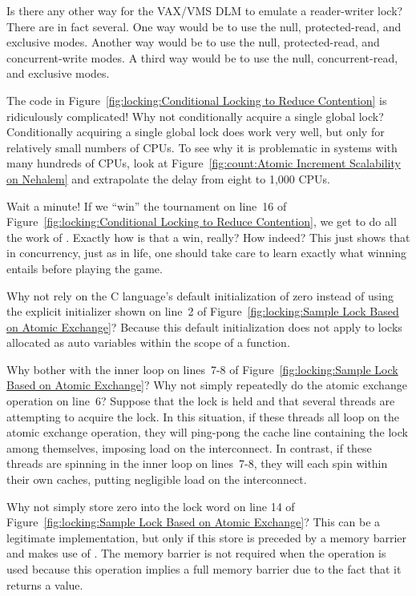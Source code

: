\begin{enumerate}
\QuickQ{}
	Is there any other way for the VAX/VMS DLM to emulate
	a reader-writer lock?
\QuickA{}
	There are in fact several.
	One way would be to use the null, protected-read, and exclusive
	modes.
	Another way would be to use the null, protected-read, and
	concurrent-write modes.
	A third way would be to use the null, concurrent-read, and
	exclusive modes.

\QuickQ{}
	The code in
	Figure~\ref{fig:locking:Conditional Locking to Reduce Contention}
	is ridiculously complicated!
	Why not conditionally acquire a single global lock?
\QuickA{}
	Conditionally acquiring a single global lock does work very well,
	but only for relatively small numbers of CPUs.
	To see why it is problematic in systems with many hundreds of
	CPUs, look at
	Figure~\ref{fig:count:Atomic Increment Scalability on Nehalem}
	and extrapolate the delay from eight to 1,000 CPUs.

\QuickQ{}
	Wait a minute!
	If we ``win'' the tournament on line~16 of
	Figure~\ref{fig:locking:Conditional Locking to Reduce Contention},
	we get to do all the work of .
	Exactly how is that a win, really?
\QuickA{}
	How indeed?
	This just shows that in concurrency, just as in life, one
	should take care to learn exactly what winning entails before
	playing the game.

\QuickQ{}
	Why not rely on the C language's default initialization of
	zero instead of using the explicit initializer shown on
	line~2 of
	Figure~\ref{fig:locking:Sample Lock Based on Atomic Exchange}?
\QuickA{}
	Because this default initialization does not apply to locks
	allocated as auto variables within the scope of a function.

\QuickQ{}
	Why bother with the inner loop on lines~7-8 of
	Figure~\ref{fig:locking:Sample Lock Based on Atomic Exchange}?
	Why not simply repeatedly do the atomic exchange operation
	on line~6?
\QuickA{}
	Suppose that the lock is held and that several threads
	are attempting to acquire the lock.
	In this situation, if these threads all loop on the atomic
	exchange operation, they will ping-pong the cache line
	containing the lock among themselves, imposing load
	on the interconnect.
	In contrast, if these threads are spinning in the inner
	loop on lines~7-8, they will each spin within their own
	caches, putting negligible load on the interconnect.

\QuickQ{}
	Why not simply store zero into the lock word on line 14 of
	Figure~\ref{fig:locking:Sample Lock Based on Atomic Exchange}?
\QuickA{}
	This can be a legitimate implementation, but only if
	this store is preceded by a memory barrier and makes use
	of .
	The memory barrier is not required when the 
	operation is used because this operation implies a
	full memory barrier due to the fact that it returns
	a value.


\end{enumerate}
